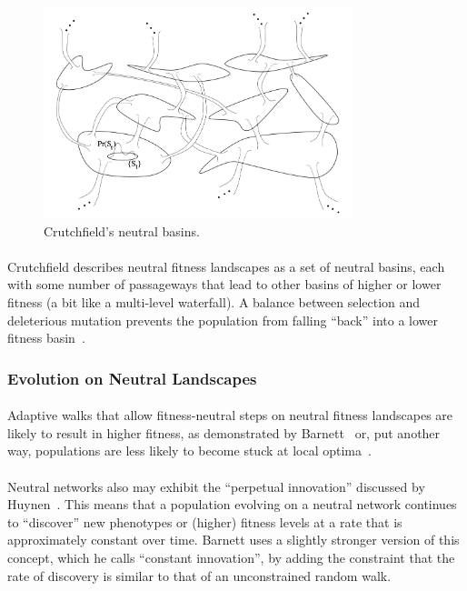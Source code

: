 \documentclass[12pt,letterpaper,titlepage]{article}
\begin{document}
\begin{figure}
    \centering
    \includegraphics[width=0.8\textwidth]{crutchfield-basins}
    \caption{Crutchfield's neutral basins.}
\label{fig:crutchfield-basins}
\end{figure}

\paragraph{}
Crutchfield describes neutral fitness landscapes as a set of neutral basins,
each with some number of passageways that lead to other basins of higher or
lower fitness (a bit like a multi-level waterfall). A balance between selection
and deleterious mutation prevents the population from falling ``back'' into a
lower fitness basin~\cite{Crutchfield1999}.

\subsubsection{Evolution on Neutral Landscapes}

\paragraph{}
Adaptive walks that allow fitness-neutral steps on neutral fitness landscapes
are likely to result in higher fitness, as demonstrated by
Barnett~\cite{Barnett1998} or, put another way, populations are less likely to
become stuck at local optima~\cite{Newman1998}.

\paragraph{}
Neutral networks also may exhibit the ``perpetual innovation'' discussed by
Huynen~\cite{Huynen1996}. This means that a population evolving on a neutral
network continues to ``discover'' new phenotypes or (higher) fitness levels at
a rate that is approximately constant over time. Barnett uses a slightly
stronger version of this concept, which he calls ``constant innovation'', by
adding the constraint that the rate of discovery is similar to that of an
unconstrained random walk.
\end{document}
